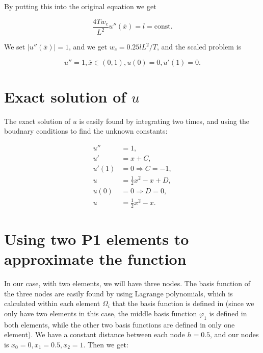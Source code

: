 \documentclass[10pt, a4paper]{amsart}
\numberwithin{figure}{section}
\numberwithin{table}{section}
\begin{document}
By putting this into the original equation we get

\begin{equation}
    \frac{4T w_c}{L^2} u''(\overline{x}) = l = \text{const}. 
\end{equation}

    We set $|u''(\overline{x})|= 1$, and we get $w_c = 0.25lL^2/T$, and the scaled problem is

    \begin{equation}
        u'' = 1, \overline{x} \in (0,1), u(0) = 0, u'(1) = 0.
    \end{equation}


\section{Exact solution of $u$}

The exact solution of $u$ is easily found by integrating two times, and using
the boudnary conditions to find the unknown constants:

\begin{align}
    u'' &= 1,\\
    u' &= x + C,\\
    u'(1) &= 0 \Rightarrow C = -1,\\
    u &= \frac{1}{2}x^2 -x + D,\\
    u(0) &= 0 \Rightarrow D = 0,\\
    u &= \frac{1}{2}x^2 - x.
\end{align}

\section{Using two P1 elements to approximate the function}

In our case, with two elements, we will have three nodes. The basis function of
the three nodes are easily found by using Lagrange polynomials, which is
calculated within each element $\Omega_i$ that the basis function is defined in
(since we only have two elements in this case, the middle basis function
$\varphi_1$ is defined in both elements, while the other two basis functions
are defined in only one element). We have a constant distance between each
node $h = 0.5$, and our nodes is $x_0 = 0, x_1 = 0.5, x_2 = 1$. Then we get:
\end{document}
